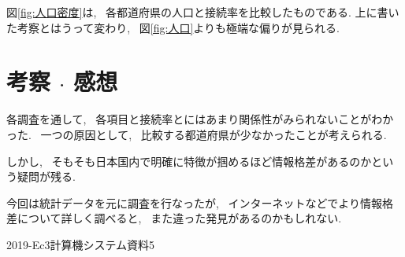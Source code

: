 \documentclass{jsarticle}
\begin{document}
        図\ref{fig:人口密度}は, ~各都道府県の人口と接続率を比較したものである.
        上に書いた考察とはうって変わり,
        ~図\ref{fig:人口}よりも極端な偏りが見られる.

\section{考察 $\cdot$ 感想}
    各調査を通して, ~各項目と接続率とにはあまり関係性がみられないことがわかった.
    ~一つの原因として, ~比較する都道府県が少なかったことが考えられる.

    しかし, ~そもそも日本国内で明確に特徴が掴めるほど情報格差があるのかという疑問が残る.

    今回は統計データを元に調査を行なったが,
    ~インターネットなどでより情報格差について詳しく調べると,
    ~また違った発見があるのかもしれない.

\begin{thebibliography}
     2019-Ec3計算機システム資料5
\end{thebibliography}
\end{document}
